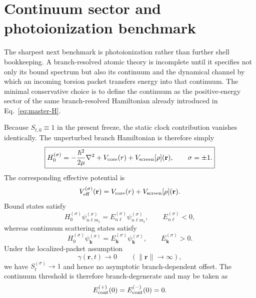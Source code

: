 \documentclass[11pt,a4paper]{article}
\begin{document}
\section{Continuum sector and photoionization benchmark}
The sharpest next benchmark is photoionization rather than further shell bookkeeping. A branch-resolved atomic theory is incomplete until it specifies not only its bound spectrum but also its continuum and the dynamical channel by which an incoming torsion packet transfers energy into that continuum. The minimal conservative choice is to define the continuum as the positive-energy sector of the same branch-resolved Hamiltonian already introduced in Eq.~\eqref{eq:master-H}.

Because $S_{t,0}\equiv 1$ in the present freeze, the static clock contribution vanishes identically. The unperturbed branch Hamiltonian is therefore simply
\begin{equation}
\label{eq:H0sigma}
\boxed{
H_0^{(\sigma)}
=
-\frac{\hbar^2}{2\mu}\nabla^2
+
V_{\rm core}(r)
+
V_{\rm screen}[\rho](\mathbf r),
\qquad
\sigma=\pm 1.
}
\end{equation}
The corresponding effective potential is
\begin{equation}
\label{eq:Veffsigma}
V_{\rm eff}^{(\sigma)}(\mathbf r)
=
V_{\rm core}(r)
+
V_{\rm screen}[\rho](\mathbf r).
\end{equation}
Bound states satisfy
\begin{equation}
\label{eq:boundstates}
H_0^{(\sigma)}\psi_{n\ell m_\ell}^{(\sigma)}
=
E_{n\ell}^{(\sigma)}\psi_{n\ell m_\ell}^{(\sigma)},
\qquad
E_{n\ell}^{(\sigma)}<0,
\end{equation}
whereas continuum scattering states satisfy
\begin{equation}
\label{eq:continuumstates}
H_0^{(\sigma)}\psi_{\mathbf k}^{(\sigma)}
=
E_{\mathbf k}^{(\sigma)}\psi_{\mathbf k}^{(\sigma)},
\qquad
E_{\mathbf k}^{(\sigma)}>0.
\end{equation}
Under the localized-packet assumption
\begin{equation}
\label{eq:gammaAsymptotic}
\gamma(\mathbf r,t)\to 0 \qquad (\lVert \mathbf r\rVert\to\infty),
\end{equation}
we have $S_t^{(\sigma)}\to 1$ and hence no asymptotic branch-dependent offset. The continuum threshold is therefore branch-degenerate and may be taken as
\begin{equation}
\label{eq:continuum-threshold}
E_{\rm cont}^{(+)}(0)=E_{\rm cont}^{(-)}(0)=0.
\end{equation}
\end{document}
